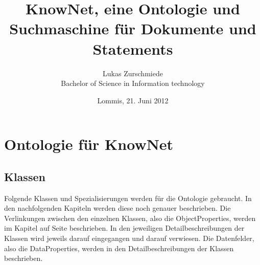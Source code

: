 ﻿\documentclass[
    11pt,
    latin1,
    a4paper,
    oneside
]{scrreprt}
\author{Lukas Zurschmiede\\Bachelor of Science in Information technology}
\date{Lommis, 21. Juni 2012}
\title{KnowNet, eine Ontologie und Suchmaschine f\"ur Dokumente und Statements}
\begin{document}
\maketitle

\newpage
\singlespacing
\tableofcontents

\pagebreak
\onehalfspacing
\setcounter{page}{1}

\chapter{Ontologie f\"ur KnowNet} \label{ontology}

\section{Klassen} \label{sec:class}

Folgende Klassen und Spezialisierungen werden für die Ontologie gebraucht. In den nachfolgenden Kapiteln werden diese noch genauer beschrieben. Die Verlinkungen zwischen den einzelnen Klassen, also die ObjectProperties, werden im Kapitel  auf Seite \pageref{sec:property} beschrieben. In den jeweiligen Detailbeschreibungen der Klassen wird jeweils darauf eingegangen und darauf verwiesen. Die Datenfelder, also die DataProperties, werden in den Detailbeschreibungen der Klassen beschrieben.

\end{document}
